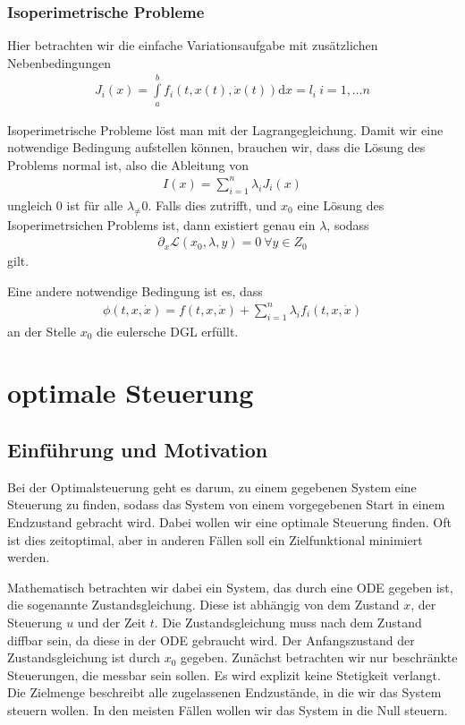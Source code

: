 \documentclass[pdftex,a4paper,oneside]{scrbook}
\begin{document}
	\subsection{Isoperimetrische Probleme}
	Hier betrachten wir die einfache Variationsaufgabe mit zusätzlichen Nebenbedingungen 
	\begin{align*}
	J_i(x ) = \int\limits_a^b f_i(t,x(t), \dot{x}(t)) \mathrm{d}x = l_i \: i=1, \dots n 
	\end{align*}
	
	Isoperimetrische Probleme löst man mit der Lagrangegleichung. 
	Damit wir eine notwendige Bedingung aufstellen können, brauchen wir, dass die Lösung des Problems normal ist, also die Ableitung von
	\begin{align*}
	I(x) = \sum\limits_{i=1}^n \lambda_i J_i(x)
	\end{align*}
	ungleich 0 ist für alle $\lambda_ \neq 0$. Falls dies zutrifft, und $x_0$ eine Lösung des Isoperimetrsichen Problems ist, dann existiert genau ein $\lambda$, sodass
	\begin{align*}
	\partial_x \mathcal{L}(x_0, \lambda, y)= 0 \: \forall y \in Z_0 
	\end{align*}
	gilt.
	
	Eine andere notwendige Bedingung ist es, dass 
	\begin{align*}
	\phi(t,x,\dot{x}) = f(t,x,\dot{x}) + \sum\limits_{i=1}^n \lambda_i f_i(t,x,\dot{x})
	\end{align*}
	an der Stelle $x_0$ die eulersche DGL erfüllt. 
	


\chapter{optimale Steuerung}

	\section{Einführung und Motivation}
	Bei der Optimalsteuerung geht es darum, zu einem gegebenen System eine Steuerung zu finden, sodass das System von einem vorgegebenen Start in einem Endzustand gebracht wird. Dabei wollen wir eine optimale Steuerung finden. Oft ist dies zeitoptimal, aber in anderen Fällen soll ein Zielfunktional minimiert werden. 
	
	Mathematisch betrachten wir dabei ein System, das durch eine ODE gegeben ist, die sogenannte Zustandsgleichung. Diese ist abhängig von dem Zustand $x$, der Steuerung $u$ und der Zeit $t$. Die Zustandsgleichung muss nach dem Zustand diffbar sein, da diese in der ODE gebraucht wird. Der Anfangszustand der Zustandsgleichung ist durch $x_0$ gegeben. Zunächst betrachten wir nur beschränkte Steuerungen, die messbar sein sollen. Es wird explizit keine Stetigkeit verlangt. Die Zielmenge beschreibt alle zugelassenen Endzustände, in die wir das System steuern wollen. In den meisten Fällen wollen wir das System in die Null steuern. 
	
\end{document}
